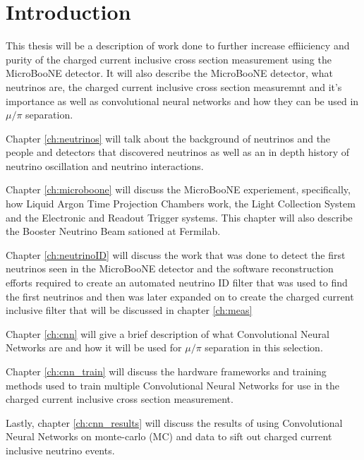 \chapter{Introduction}
This thesis will be a description of work done to further increase effiiciency and purity of the charged current inclusive cross section measurement using the MicroBooNE detector. It will also describe the MicroBooNE detector, what neutrinos are, the charged current inclusive cross section measuremnt and it's importance as well as convolutional neural networks and how they can be used in $\mu/\pi$ separation. 

Chapter \ref{ch:neutrinos} will talk about the background of neutrinos and the people and detectors that discovered neutrinos as well as an in depth history of neutrino oscillation and neutrino interactions. 

Chapter \ref{ch:microboone} will discuss the MicroBooNE experiement, specifically, how Liquid Argon Time Projection Chambers work, the Light Collection System and the Electronic and Readout Trigger systems. This chapter will also describe the Booster Neutrino Beam sationed at Fermilab.
 
Chapter \ref{ch:neutrinoID} will discuss the work that was done to detect the first neutrinos seen in the MicroBooNE detector and the software reconstruction efforts required to create an automated neutrino ID filter that was used to find the first neutrinos and then was later expanded on to create the charged current inclusive filter that will be discussed in chapter \ref{ch:meas}

Chapter \ref{ch:cnn} will give a brief description of what Convolutional Neural Networks are and how it will be used for $\mu/\pi$ separation in this selection.

Chapter \ref{ch:cnn_train} will discuss the hardware frameworks and training methods used to train multiple Convolutional Neural Networks for use in the charged current inclusive cross section measurement.

Lastly, chapter \ref{ch:cnn_results} will discuss the results of using Convolutional Neural Networks on monte-carlo (MC) and data to sift out charged current inclusive neutrino events. 
